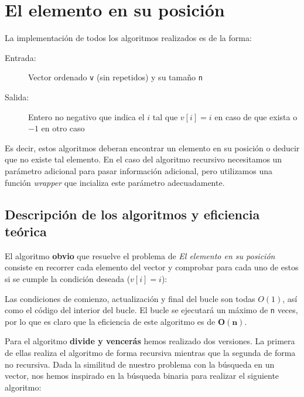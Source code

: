 \section{El elemento en su posición}

La implementación de todos los algoritmos realizados es de la forma:
\begin{description}
 \item[Entrada:] Vector ordenado \texttt{v} (sin repetidos) y su tamaño \texttt{n}
 \item[Salida:] Entero no negativo que indica el $i$ tal que $v[i]=i$ en caso de que exista o $-1$ en otro caso
\end{description}

Es decir, estos algoritmos deberan encontrar un elemento en su posición o deducir que no existe tal elemento. En el caso del algoritmo recursivo necesitamos un parámetro adicional para pasar información adicional, pero utilizamos una función \textit{wrapper} que incializa este parámetro adecuadamente.

\subsection{Descripción de los algoritmos y eficiencia teórica}

El algoritmo \textbf{obvio} que resuelve el problema de \textit{El elemento en su posición} consiste
en recorrer cada elemento del vector y comprobar para cada uno de estos si se cumple la
condición deseada ($v[i] = i$):



Las condiciones de comienzo, actualización y final del bucle son todas $O(1)$, así como el código del interior del bucle. El bucle se ejecutará un máximo de \texttt{n} veces, por lo que es claro que la eficiencia de este algoritmo es de $\mathbf{O(n)}$.

\vspace*{1cm}
\hrulefill
\vspace*{1cm}

Para el algoritmo \textbf{divide y vencerás} hemos realizado dos versiones. La primera de ellas realiza el algoritmo de forma recursiva mientras que la segunda de forma no recursiva. Dada la similitud de nuestro problema con la búsqueda en un vector, nos hemos inspirado en la búsqueda binaria para realizar el siguiente algoritmo:



